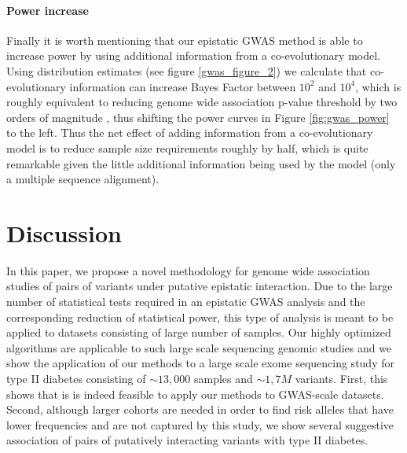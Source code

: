 \paragraph{Power increase}
Finally it is worth mentioning that our epistatic GWAS method is able to increase power by using additional information from a co-evolutionary model.
Using distribution estimates (see figure \ref{gwas_figure_2}) we calculate that co-evolutionary information can increase Bayes Factor between $10^2$ and $10^4$, which is roughly equivalent to reducing genome wide association p-value threshold by two orders of magnitude \cite{goodman1999toward}, thus shifting the power curves in Figure \ref{fig:gwas_power} to the left.
Thus the net effect of adding information from a co-evolutionary model is to reduce sample size requirements roughly by half, which is quite remarkable given the little additional information being used by the model (only a multiple sequence alignment).

\section{Discussion}

In this paper, we propose a novel methodology for genome wide association studies of pairs of variants under putative epistatic interaction. 
Due to the large number of statistical tests required in an epistatic GWAS analysis and the corresponding reduction of statistical power, this type of analysis is meant to be applied to datasets consisting of large number of samples.
Our highly optimized algorithms are applicable to such large scale sequencing genomic studies and we show the application of our methods to a large scale exome sequencing study for type II diabetes consisting of $\sim 13,000$ samples and $\sim 1,7M$ variants. 
First, this shows that is is indeed feasible to apply our methods to GWAS-scale datasets. 
Second, although larger cohorts are needed in order to find risk alleles that have lower frequencies and are not captured by this study, we show several suggestive association of pairs of putatively interacting variants with type II diabetes. 

